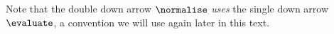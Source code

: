 
Note that the double down arrow $\normalise$ \emph{uses} the single down arrow $\evaluate$,
a convention we will use again later in this text.
